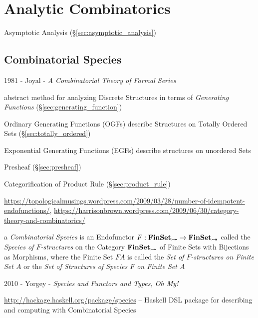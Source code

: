 \section{Analytic Combinatorics}\label{sec:analytic_combinatorics}

\cite{flajolet-sedgewick09}

Asymptotic Analysis (\S\ref{sec:asymptotic_analysis})



\subsection{Combinatorial Species}\label{sec:combinatorial_species}

1981 - Joyal - \emph{A Combinatorial Theory of Formal Series}

abstract method for analyzing Discrete Structures in terms of \emph{Generating
  Functions} (\S\ref{sec:generating_function})

Ordinary Generating Functions (OGFs) describe Structures on Totally Ordered Sets
(\S\ref{sec:totally_ordered})

Exponential Generating Functions (EGFs) describe structures on unordered Sets

Presheaf (\S\ref{sec:presheaf})

Categorification of Product Rule (\S\ref{sec:product_rule}) %

\url{https://topologicalmusings.wordpress.com/2009/03/28/number-of-idempotent-endofunctions/},
\url{https://harrisonbrown.wordpress.com/2009/06/30/category-theory-and-combinatorics/}

a \emph{Combinatorial Species} is an Endofunctor $F : \mathbf{FinSet}_{\rightarrowtail\hspace{-8pt}\twoheadrightarrow}
\rightarrow \mathbf{FinSet}_{\rightarrowtail\hspace{-8pt}\twoheadrightarrow}$ called the \emph{Species of $F$-structures}
on the Category $\mathbf{FinSet}_{\rightarrowtail\hspace{-8pt}\twoheadrightarrow}$ of Finite Sets with Bijections as
Morphisms, where the Finite Set $F A$ is called the \emph{Set of $F$-structures
  on Finite Set $A$} or the \emph{Set of Structures of Species $F$ on Finite Set
  $A$}

2010 - Yorgey - \emph{Species and Functors and Types, Oh My!}

\url{http://hackage.haskell.org/package/species} -- Haskell DSL package for
describing and computing with Combinatorial Species




